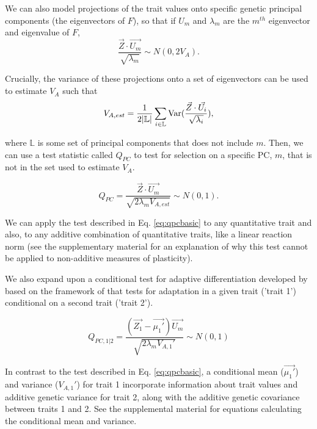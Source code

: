 \documentclass[11pt,letterpaper]{article}
\begin{document}
We can also model projections of the trait values onto specific genetic principal components (the eigenvectors of $F$), so that if $U_{m}$ and $\lambda_{m}$ are the $m^{th}$ eigenvector and eigenvalue of $F$,
\begin{equation}
\frac{\vec{Z}\cdot \vec{U_{m}}}{\sqrt{\lambda_{m}}} \sim N(0, 2V_{A}).
\end{equation}

Crucially, the variance of these projections onto a set of eigenvectors can be used to estimate $V_{A}$ such that 
\begin{equation}\label{eq:vaest}
V_{A, est} = \frac{1}{2\lvert \mathbb{L} \rvert} \sum_{i\in \mathbb{L}}\textnormal{Var}(\frac{\vec{Z}\cdot \vec{U_{i}}}{\sqrt{\lambda_{i}}}),
\end{equation}

where $\mathbb{L}$ is some set of principal components that does not include $m$.
Then, we can use a test statistic called $Q_{PC}$ to test for selection on a specific PC, $m$, that is not in the set used to estimate $V_{A}$. 

\begin{equation}\label{eq:qpcbasic}
Q_{PC} = \frac{\vec{Z}\cdot\vec{U_{m}}}{\sqrt{2\lambda_{m}V_{A,est}}}\sim N(0,1).
  \end{equation}

We can apply the test described in Eq. \ref{eq:qpcbasic} to any quantitative trait and also, to any additive combination of quantitative traits, like a linear reaction norm (see the supplementary material for an explanation of why this test cannot be applied to non-additive measures of plasticity).

We also expand upon a conditional test for adaptive differentiation developed by \cite{Berg2017} based on the framework of \cite{lande1979quantitative} that tests for adaptation in a given trait ('trait 1') conditional on a second trait ('trait 2').

\begin{equation}
Q_{PC, 1|2} = \frac{(\vec{Z_{1}} - \vec{\mu_{1}'})\vec{U_{m}}}{\sqrt{2\lambda_{m}V_{A,1}'}}  \sim N(0,1)
  \end{equation}

In contrast to the test described in Eq. \ref{eq:qpcbasic}, a conditional mean ($\vec{\mu_{1}'}$) and variance ($V_{A,1}'$) for trait 1 incorporate information about trait values and additive genetic variance for trait 2, along with the additive genetic covariance between traits 1 and 2.
See the supplemental material for equations calculating the conditional mean and variance.
\end{document}
